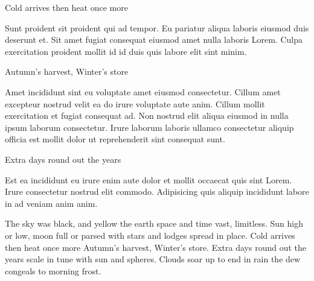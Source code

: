 {\mktsHTwo{}\cjkgGlue{} Cold arrives then heat once more\mktsHTwoBEG}

\vspace{\myLineheight}\begin{multicols}{2}\raggedcolumns{}Sunt proident sit proident qui ad tempor. Eu pariatur aliqua laboris eiusmod duis deserunt et. Sit amet fugiat consequat eiusmod amet nulla laboris Lorem. Culpa exercitation proident mollit id id duis quis labore elit sint minim.



\end{multicols}


{\mktsHOne{}\cjkgGlue{} Autumn’s harvest, Winter’s store\mktsHOneBEG}

\vspace{\myLineheight}\begin{multicols}{2}\raggedcolumns{}Amet incididunt sint eu voluptate amet eiusmod consectetur. Cillum amet excepteur nostrud velit ea do irure voluptate aute anim. Cillum mollit exercitation et fugiat consequat ad. Non nostrud elit aliqua eiusmod in nulla ipsum laborum consectetur. Irure laborum laboris ullamco consectetur aliquip officia est mollit dolor ut reprehenderit sint consequat sunt.



\end{multicols}


{\mktsHTwo{}\cjkgGlue{} Extra days round out the years\mktsHTwoBEG}

\vspace{\myLineheight}\begin{multicols}{2}\raggedcolumns{}Est ea incididunt eu irure enim aute dolor et mollit occaecat quis sint Lorem. Irure consectetur nostrud elit commodo. Adipisicing quis aliquip incididunt labore in ad veniam anim anim.



\cjkgGlue{} The sky was black, and yellow the earth
\cjkgGlue{} space and time vast, limitless.
\cjkgGlue{} Sun high or low, moon full or parsed
\cjkgGlue{} with stars and lodges spread in place.
\cjkgGlue{} Cold arrives then heat once more
\cjkgGlue{} Autumn’s harvest, Winter’s store.
\cjkgGlue{} Extra days round out the years
\cjkgGlue{} scale in tune with sun and spheres.
\cjkgGlue{} Clouds soar up to end in rain
\cjkgGlue{} the dew congeals to morning frost.

\end{multicols}



